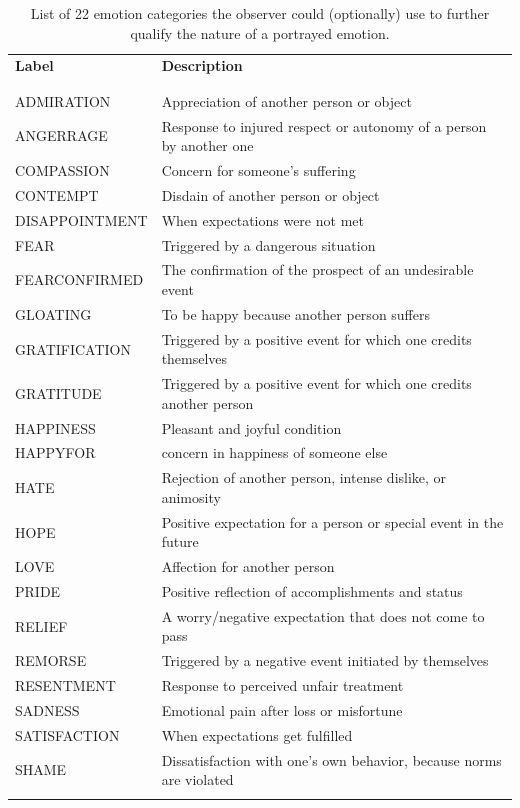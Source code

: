 \documentclass[10pt,a4paper,twocolumn]{article}
\begin{document}
\begin{table}
  \centering
  \begin{tabular}{lp{10cm}}
    \textbf{Label} & \textbf{Description} \\
    \\\hline\\
    ADMIRATION & Appreciation of another person or object \\
    ANGERRAGE & Response to injured respect or autonomy of a person by another one \\
    COMPASSION & Concern for someone's suffering \\
    CONTEMPT & Disdain of another person or object \\
    DISAPPOINTMENT & When expectations were not met \\
    FEAR & Triggered by a dangerous situation \\
    FEARCONFIRMED & The confirmation of the prospect of an undesirable event\\
    GLOATING & To be happy because another person suffers \\
    GRATIFICATION & Triggered by a positive event for which one credits themselves \\
    GRATITUDE & Triggered by a positive event for which one credits another person \\
    HAPPINESS & Pleasant and joyful condition \\
    HAPPYFOR & concern in happiness of someone else \\
    HATE & Rejection of another person, intense dislike, or animosity \\
    HOPE & Positive expectation for a person or special event in the future \\
    LOVE & Affection for another person \\
    PRIDE & Positive reflection of accomplishments and status \\
    RELIEF & A worry/negative expectation that does not come to pass \\
    REMORSE & Triggered by a negative event initiated by themselves \\
    RESENTMENT & Response to perceived unfair treatment \\
    SADNESS & Emotional pain after loss or misfortune \\
    SATISFACTION & When expectations get fulfilled \\
    SHAME & Dissatisfaction with one's own behavior, because norms are violated \\
    \\\hline
  \end{tabular}
  \caption{List of 22 emotion categories the observer could (optionally) use to
    further qualify the nature of a portrayed emotion.}
  \label{tab:emotion_categories}
\end{table}
\end{document}
